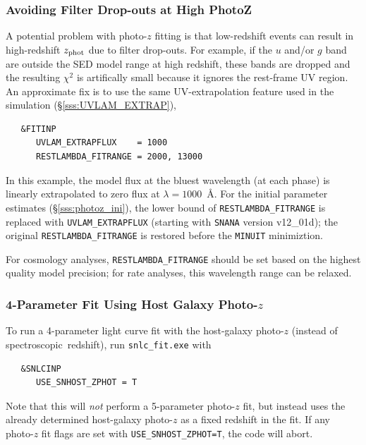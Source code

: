\documentclass[12pt]{article}
\newcommand{\Zphot}{z_{\rm phot}}
\newcommand{\spec}{spectroscopic}
\newcommand{\lam}{\lambda}
\begin{document}
   \subsubsection{Avoiding Filter Drop-outs at High PhotoZ}
   \label{sss:avoid_filter_dropouts}

A potential problem with photo-$z$ fitting is that low-redshift events
can result in high-redshift $\Zphot$ due to filter drop-outs.
For example, if the $u$ and/or $g$ band are outside the SED model 
range at high redshift, these bands are dropped and the resulting 
$\chi^2$ is artifically small because it ignores the rest-frame UV region.
An approximate fix is to use the same UV-extrapolation feature used
in the simulation (\S\ref{sss:UVLAM_EXTRAP}),
\begin{verbatim}
   &FITINP
      UVLAM_EXTRAPFLUX    = 1000          
      RESTLAMBDA_FITRANGE = 2000, 13000 
\end{verbatim}
In this example, the model flux at the bluest wavelength (at each phase)
is linearly extrapolated to zero flux at $\lam=1000$~\AA.
For the initial parameter estimates (\S\ref{sss:photoz_ini}),
the lower bound of \verb|RESTLAMBDA_FITRANGE| is replaced with
\verb|UVLAM_EXTRAPFLUX| (starting with {\tt SNANA} version v12\_01d); 
the original \verb|RESTLAMBDA_FITRANGE|
is restored before the {\tt MINUIT} minimiztion.

For cosmology analyses, \verb|RESTLAMBDA_FITRANGE| should be set
based on the highest quality model precision; 
for rate analyses, this wavelength range can be relaxed.

  \clearpage
   \subsubsection{4-Parameter Fit Using Host Galaxy Photo-$z$ }
   \label{sss:zphot_host}

To run a 4-parameter light curve fit with the host-galaxy photo-$z$
(instead of \spec\ redshift), run {\tt snlc\_fit.exe} with
\begin{verbatim}
   &SNLCINP
      USE_SNHOST_ZPHOT = T
\end{verbatim}
Note that this will {\it not} perform a 5-parameter photo-$z$ fit, 
but instead uses the already determined host-galaxy photo-$z$
as a fixed redshift in the fit. If any photo-$z$ fit flags are set
with {\tt USE\_SNHOST\_ZPHOT=T}, the code will abort.
\end{document}

